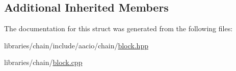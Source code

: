 \subsection*{Additional Inherited Members}


The documentation for this struct was generated from the following files\+:\begin{DoxyCompactItemize}
\item 
libraries/chain/include/aacio/chain/\mbox{\hyperlink{block_8hpp}{block.\+hpp}}\item 
libraries/chain/\mbox{\hyperlink{block_8cpp}{block.\+cpp}}\end{DoxyCompactItemize}
